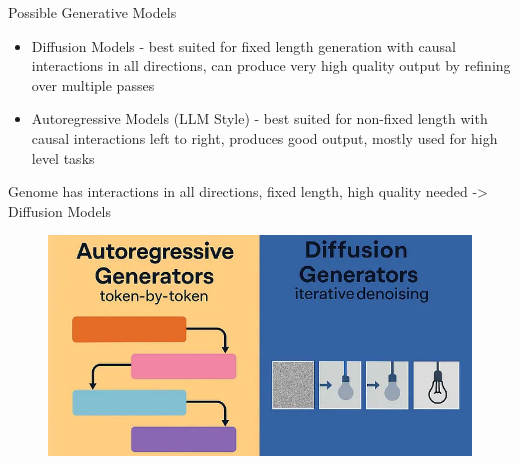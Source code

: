 \documentclass[compress, aspectratio=169]{beamer}
\begin{document}
\begin{frame}{Possible Generative Models}

\begin{multicols}{2}
\begin{itemize}
    \item Diffusion Models - best suited for fixed length generation with causal interactions in all directions, can produce very high quality output by refining over multiple passes
    \item Autoregressive Models (LLM Style) - best suited for non-fixed length with causal interactions left to right, produces good output, mostly used for high level tasks
\end{itemize}

Genome has interactions in all directions, fixed length, high quality needed \newline -> Diffusion Models

\columnbreak

\begin{figure}
    \centering
    \includegraphics[width=1.0\linewidth]{figures/autovsdiff.png}
\end{figure}
\end{multicols}

\end{frame}
\end{document}
